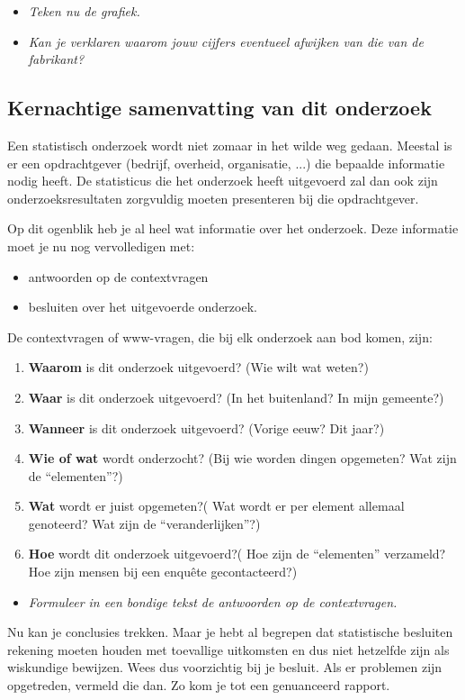 \documentclass[11pt]{article}
\newcommand{\vraag}[2]{\begin{itemize}\item {\it #1} \vspace*{#2}\end{itemize}}
\begin{document}
\vraag{Teken nu de grafiek.}{0cm}
\begin{center}
  
\end{center}

\vraag{Kan je verklaren waarom jouw cijfers eventueel afwijken van die van de fabrikant?}{3cm}

\subsection{Kernachtige samenvatting van dit onderzoek}

Een statistisch onderzoek wordt niet zomaar in het wilde weg gedaan. Meestal is er een
opdrachtgever (bedrijf, overheid, organisatie, ...) die bepaalde informatie nodig heeft. De statisticus
die het onderzoek heeft uitgevoerd zal dan ook zijn onderzoeksresultaten zorgvuldig moeten
presenteren bij die opdrachtgever.

Op dit ogenblik heb je al heel wat informatie over het onderzoek. Deze informatie moet je nu nog
vervolledigen met:
\begin{itemize}
  \item antwoorden op de contextvragen
  \item besluiten over het uitgevoerde onderzoek.
\end{itemize}

De contextvragen of www-vragen, die bij elk onderzoek aan bod komen, zijn:
\begin{enumerate}
  \item {\bf Waarom} is dit onderzoek uitgevoerd? (Wie wilt wat weten?)
  \item {\bf Waar} is dit onderzoek uitgevoerd? (In het buitenland? In mijn gemeente?)
  \item {\bf Wanneer} is dit onderzoek uitgevoerd? (Vorige eeuw? Dit jaar?)
  \item {\bf Wie of wat} wordt onderzocht? (Bij wie worden dingen opgemeten? Wat zijn de
“elementen”?)
  \item {\bf Wat} wordt er juist opgemeten?( Wat wordt er per element allemaal genoteerd? Wat
zijn de “veranderlijken”?)
  \item {\bf Hoe} wordt dit onderzoek uitgevoerd?( Hoe zijn de “elementen” verzameld? Hoe zijn
mensen bij een enquête gecontacteerd?)
\end{enumerate}

\vraag{Formuleer in een bondige tekst de antwoorden op de contextvragen.}{4cm}

Nu kan je conclusies trekken. Maar je hebt al begrepen dat statistische besluiten rekening moeten
houden met toevallige uitkomsten en dus niet hetzelfde zijn als wiskundige bewijzen.
Wees dus voorzichtig bij je besluit. Als er problemen zijn opgetreden, vermeld die dan. Zo kom je
tot een genuanceerd rapport.
\end{document}
